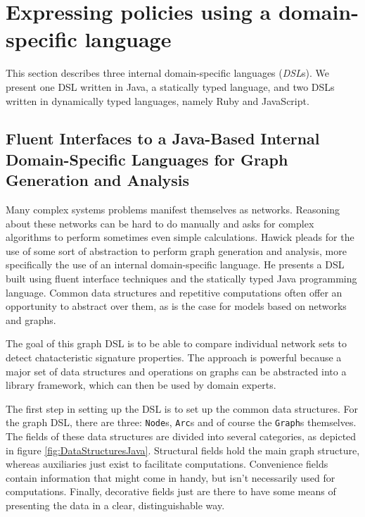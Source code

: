 \section{Expressing policies using a domain-specific language} %

This section describes three internal domain-specific languages (\textit{DSL}s). We present one DSL written in Java, a statically typed language, and two DSLs written in dynamically typed languages, namely Ruby and JavaScript.

\subsection{Fluent Interfaces to a Java-Based Internal Domain-Specific Languages for Graph Generation and Analysis}
Many complex systems problems manifest themselves as networks. Reasoning about these networks can be hard to do manually and asks for complex algorithms to perform sometimes even simple calculations. Hawick\cite{FluentInterfacesJava} pleads for the use of some sort of abstraction to perform graph generation and analysis, more specifically the use of an internal domain-specific language. He presents a DSL built using fluent interface techniques and the statically typed Java programming language. Common data structures and repetitive computations often offer an opportunity to abstract over them, as is the case for models based on networks and graphs.

The goal of this graph DSL is to be able to compare individual network sets to detect chatacteristic signature properties. The approach is powerful because a major set of data structures and operations on graphs can be abstracted into a library framework, which can then be used by domain experts. 

The first step in setting up the DSL is to set up the common data structures. For the graph DSL, there are three: \texttt{Node}s, \texttt{Arc}s and of course the \texttt{Graph}s themselves. The fields of these data structures are divided into several categories, as depicted in figure \ref{fig:DataStructuresJava}. Structural fields hold the main graph structure, whereas auxiliaries just exist to facilitate computations. Convenience fields contain information that might come in handy, but isn't necessarily used for computations. Finally, decorative fields just are there to have some means of presenting the data in a clear, distinguishable way.

